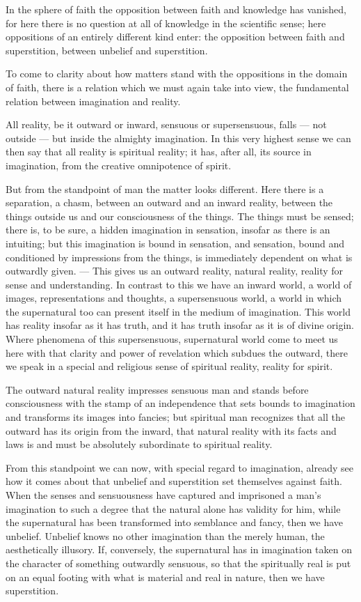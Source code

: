 \documentclass[12pt,a4paper,openany]{book}
\newcommand{\opage}[1]{\marginnote{\footnotesize\textit{[#1]}}}
\begin{document}
In the sphere of faith the opposition between faith and knowledge has vanished, for here there is no question at all of knowledge in the scientific sense; here oppositions of an entirely different kind enter: the opposition between faith and superstition, between unbelief and superstition.

To come to clarity about how matters stand with the oppositions in the domain of faith,
\setcounter{footnote}{0}%
\opage{45}there is a relation which we must again take into view, the fundamental relation between imagination and reality.

All reality, be it outward or inward, sensuous or supersensuous, falls --- not outside --- but inside the almighty imagination. In this very highest sense we can then say that all reality is spiritual reality; it has, after all, its source in imagination, from the creative omnipotence of spirit.

But from the standpoint of man the matter looks different. Here there is a separation, a chasm, between an outward and an inward reality, between the things outside us and our consciousness of the things. The things must be sensed; there is, to be sure, a hidden imagination in sensation, insofar as there is an intuiting; but this imagination is bound in sensation, and sensation, bound and conditioned by impressions from the things, is immediately dependent on what is outwardly given. --- This gives us an outward reality, natural reality, reality for sense and understanding. In contrast to this we have an inward world, a world of images, representations and thoughts, a supersensuous world, a world in which the supernatural too can present itself in the medium of imagination. This world has reality insofar as it has truth, and it has truth insofar as it is of divine origin. Where phenomena of this supersensuous, supernatural world come to meet us here with that clarity and power of revelation which subdues the outward, there we speak in a special and religious sense of spiritual reality, reality for spirit.

The outward natural reality impresses sensuous man and stands before consciousness with the stamp of
\setcounter{footnote}{0}%
\opage{46}an independence that sets bounds to imagination and transforms its images into fancies; but spiritual man recognizes that all the outward has its origin from the inward, that natural reality with its facts and laws is and must be absolutely subordinate to spiritual reality.

From this standpoint we can now, with special regard to imagination, already see how it comes about that unbelief and superstition set themselves against faith. When the senses and sensuousness have captured and imprisoned a man's imagination to such a degree that the natural alone has validity for him, while the supernatural has been transformed into semblance and fancy, then we have unbelief. Unbelief knows no other imagination than the merely human, the aesthetically illusory. If, conversely, the supernatural has in imagination taken on the character of something outwardly sensuous, so that the spiritually real is put on an equal footing with what is material and real in nature, then we have superstition.
\end{document}
